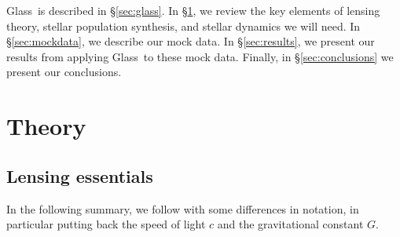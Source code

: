 \documentclass[galley,usenatbib]{mn2e}
\newcommand{\Glass}{{\sc Glass}}
\newcommand{\secref}[1] {\S\ref{#1}}
\begin{document}
\Glass\ is described in \secref{sec:glass}.  In \secref{sec:theory}, we review
the key elements of lensing theory, stellar population synthesis, and stellar
dynamics we will need. In \secref{sec:mockdata}, we describe our mock data. In
\secref{sec:results}, we present our results from applying \Glass\ to these
mock data. Finally, in \secref{sec:conclusions} we present our conclusions. 

\section{Theory}\label{sec:theory}

\subsection{Lensing essentials}\label{sec:lensing_basic}

In the following summary, we follow \cite{1986ApJ...310..568B} with
some differences in notation, in particular putting back the
speed of light $c$ and the gravitational constant $G$.
\end{document}
